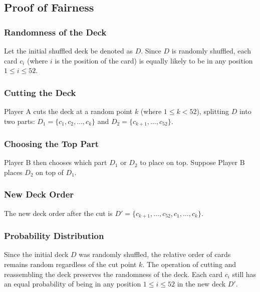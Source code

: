 \documentclass{article}
\begin{document}
\subsection*{Proof of Fairness}

\subsubsection*{Randomness of the Deck}

Let the initial shuffled deck be denoted as \( D \). Since \( D \) is randomly shuffled, each card \( c_i \) (where \( i \) is the position of the card) is equally likely to be in any position \( 1 \leq i \leq 52 \).

\subsubsection*{Cutting the Deck}

Player A cuts the deck at a random point \( k \) (where \( 1 \leq k < 52 \)), splitting \( D \) into two parts: \( D_1 = \{c_1, c_2, \ldots, c_k\} \) and \( D_2 = \{c_{k+1}, \ldots, c_{52}\} \).

\subsubsection*{Choosing the Top Part}

Player B then chooses which part \( D_1 \) or \( D_2 \) to place on top. Suppose Player B places \( D_2 \) on top of \( D_1 \).

\subsubsection*{New Deck Order}

The new deck order after the cut is \( D' = \{c_{k+1}, \ldots, c_{52}, c_1, \ldots, c_k\} \).

\subsubsection*{Probability Distribution}

Since the initial deck \( D \) was randomly shuffled, the relative order of cards remains random regardless of the cut point \( k \). The operation of cutting and reassembling the deck preserves the randomness of the deck. Each card \( c_i \) still has an equal probability of being in any position \( 1 \leq i \leq 52 \) in the new deck \( D' \).
\end{document}
